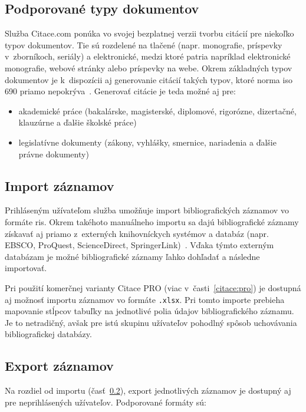 \documentclass[
  color,
  table,
  nolof,
  oneside,
]{fithesis3}
\begin{document}
\subsection{Podporované typy dokumentov}\label{citace:types}

Služba Citace.com ponúka vo svojej bezplatnej verzii tvorbu citácií pre niekoľko typov dokumentov. Tie sú rozdelené na tlačené (napr. monografie, príspevky v~zborníkoch, seriály) a elektronické, medzi ktoré patria napríklad elektronické monografie, webové stránky alebo príspevky na webe. Okrem základných typov dokumentov je k~dispozícii aj generovanie citácií takých typov, ktoré norma \gls{iso} 690 priamo nepokrýva~\cite{Firstova2011:notincluded}. Generovať citácie je teda možné aj pre:

\begin{itemize}
\item akademické práce (bakalárske, magisterské, diplomové, rigorózne, dizertačné, klauzúrne a ďalšie školské práce)
\item legislatívne dokumenty (zákony, vyhlášky, smernice, nariadenia a ďalšie právne dokumenty)
\end{itemize}

\subsection{Import záznamov}\label{citace:import}

Prihláseným užívateľom služba umožňuje import bibliografických záznamov vo formáte \gls{ris}. Okrem takéhoto manuálneho importu sa dajú bibliografické záznamy získavať aj priamo z~externých knihovníckych systémov a databáz (napr. EBSCO, ProQuest, ScienceDirect, SpringerLink)~\cite{CitacePRO}. Vďaka týmto externým databázam je možné bibliografické záznamy ľahko dohľadať a následne importovať.

Pri použití komerčnej varianty Citace PRO (viac v~časti~\ref{citace:pro}) je dostupná aj možnosť importu záznamov vo formáte \texttt{.xlsx}. Pri tomto importe prebieha mapovanie stĺpcov tabuľky na jednotlivé polia údajov bibliografického záznamu. Je to netradičný, avšak pre istú skupinu užívateľov pohodlný spôsob uchovávania bibliografickej databázy.

\subsection{Export záznamov}\label{citace:export}

Na rozdiel od importu (časť~\ref{citace:import}), export jednotlivých záznamov je dostupný aj pre neprihlásených užívateľov. Podporované formáty sú:
\end{document}
